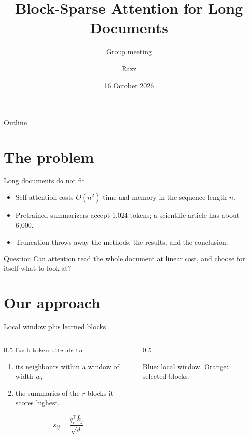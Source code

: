 \documentclass[aspectratio=169]{beamer}
\title{Block-Sparse Attention for Long Documents}
\subtitle{Group meeting}
\author{Razz}
\institute{Institute for Computational Linguistics}
\date{16 October 2026}
\begin{document}
\begin{frame}
  \titlepage
\end{frame}

\begin{frame}{Outline}
  \tableofcontents
\end{frame}

\section{The problem}

\begin{frame}{Long documents do not fit}
  \begin{itemize}
    \item Self-attention costs $O(n^2)$ time and memory in the sequence length $n$.
    \item Pretrained summarizers accept 1{,}024 tokens; a scientific article has about 6{,}000.
    \item Truncation throws away the methods, the results, and the conclusion.
  \end{itemize}
  \pause
  \begin{block}{Question}
    Can attention read the whole document at linear cost, and choose for itself what to look at?
  \end{block}
\end{frame}

\section{Our approach}

\begin{frame}{Local window plus learned blocks}
  \begin{columns}
    \begin{column}{0.5\textwidth}
      Each token attends to
      \begin{enumerate}
        \item its neighbours within a window of width $w$,
        \item the summaries of the $r$ blocks it scores highest.
      \end{enumerate}
      \[
        s_{ij} = \frac{q_i^\top \bar{k}_j}{\sqrt{d}}
      \]
    \end{column}
    \begin{column}{0.5\textwidth}
      \centering

      {\footnotesize Blue: local window. Orange: selected blocks.}
    \end{column}
  \end{columns}
\end{frame}
\end{document}
